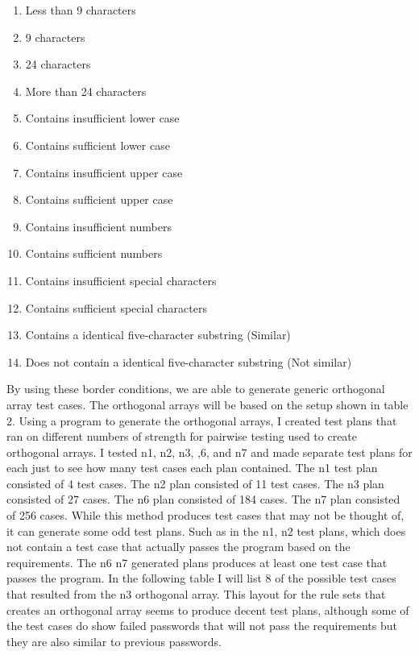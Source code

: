 \documentclass[12pt,letterpaper]{article}
\begin{document}
\begin{enumerate}
\item Less than 9 characters
\item 9 characters
\item 24 characters
\item More than 24 characters
\item Contains insufficient lower case
\item Contains sufficient lower case
\item Contains insufficient upper case
\item Contains sufficient upper case
\item Contains insufficient numbers
\item Contains sufficient numbers
\item Contains insufficient special characters
\item Contains sufficient special characters
\item Contains a identical five-character substring (Similar)
\item Does not contain a identical five-character substring (Not similar)
\end{enumerate}

By using these border conditions, we are able to generate generic orthogonal array test cases.  The orthogonal arrays will be based on the setup
shown in table 2. Using a program to generate the orthogonal arrays, I created test plans that ran on different numbers of
strength for pairwise testing used to create orthogonal arrays. I tested n1, n2, n3, ,6, and n7 and made separate test plans for each
just to see how many test cases each plan contained. The n1 test plan consisted of 4 test cases. The n2 plan consisted of 11 test cases.
The n3 plan consisted of 27 cases. The n6 plan consisted of 184 cases. The n7 plan consisted of 256 cases. While this method produces
test cases that may not be thought of, it can generate some odd test plans. Such as in the n1, n2 test plans, which does not
contain a test case that actually passes the program based on the requirements. The n6 n7 generated plans produces at least one
test case that passes the program. In the following table I will list 8 of the possible test cases that resulted from the n3 orthogonal array.
This layout for the rule sets that creates an orthogonal array seems to produce decent test plans, although some of the test cases
do show failed passwords that will not pass the requirements but they are also similar to previous passwords.
\end{document}
